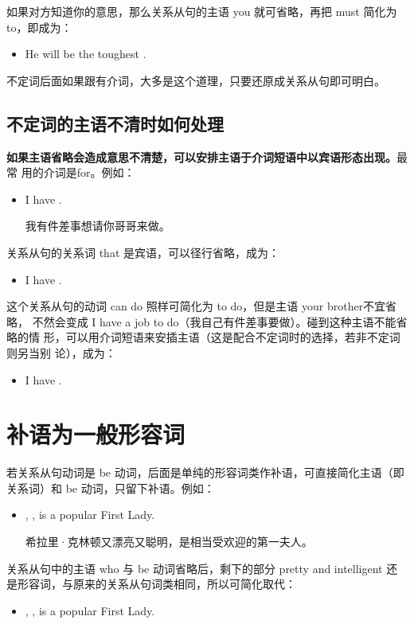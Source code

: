 如果对方知道你的意思，那么关系从句的主语 you 就可省略，再把 must 简化为
to，即成为：
\begin{itemize}
\item He will be the toughest  .
\end{itemize}

不定词后面如果跟有介词，大多是这个道理，只要还原成关系从句即可明白。

\subsection{不定词的主语不清时如何处理}

\textbf{如果主语省略会造成意思不清楚，可以安排主语于介词短语中以宾语形态出现。}最常
用的介词是for。例如：
\begin{itemize}
\item I have  .

  我有件差事想请你哥哥来做。
\end{itemize}
关系从句的关系词 that 是宾语，可以径行省略，成为：
\begin{itemize}
\item I have  .
\end{itemize}
这个关系从句的动词 can do 照样可简化为 to do，但是主语 your brother不宜省略，
不然会变成 I have a job to do（我自己有件差事要做）。碰到这种主语不能省略的情
形，可以用介词短语来安插主语（这是配合不定词时的选择，若非不定词则另当别
论），成为：
\begin{itemize}
\item I have  .
\end{itemize}

\section{补语为一般形容词}

若关系从句动词是 be
动词，后面是单纯的形容词类作补语，可直接简化主语（即关系词）和 be
动词，只留下补语。例如：

\begin{itemize}
\item {}, , is a popular First Lady.

  希拉里·克林顿又漂亮又聪明，是相当受欢迎的第一夫人。
\end{itemize}
关系从句中的主语 who 与 be 动词省略后，剩下的部分 pretty and intelligent
还是形容词，与原来的关系从句词类相同，所以可简化取代：
\begin{itemize}
\item {}, , is a popular First Lady.
\end{itemize}

